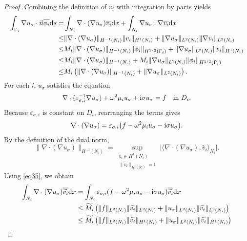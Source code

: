 \documentclass[12pt,reqno]{amsart}
\numberwithin{equation}{section}
\begin{document}
\begin{proof}
Combining the definition of $v_i$ with integration by parts yields
\begin{align}\label{eq18}
\int_{\Gamma_i}\nabla u_\sigma\cdot\vec{n}\overline{\phi_i}{\rm d}s=&\int_{N_i}\nabla\cdot(\nabla u_\sigma)\overline{v_i}{\rm d}x+\int_{N_i}\nabla u_\sigma\cdot\nabla\overline{v_i}{\rm d}x \nonumber\\
\leq&\|\nabla\cdot(\nabla u_\sigma)\|_{H^{-1}(N_i)}\|v_i\|_{H^1(N_i)}+\|\nabla u_\sigma\|_{L^2(N_i)}\|\nabla v_i\|_{L^2(N_i)} \nonumber\\
\leq& M_i\|\nabla\cdot(\nabla u_\sigma)\|_{H^{-1}(N_i)}\|\phi_i\|_{H^{1/2}(\Gamma_i)}+\|\nabla u_\sigma\|_{L^2(N_i)}\|v_i\|_{H^1(N_i)} \nonumber\\
\leq& M_i\|\nabla\cdot(\nabla u_\sigma)\|_{H^{-1}(N_i)}+M_i\|\nabla u_\sigma\|_{L^2(N_i)}\|\phi_i\|_{H^{1/2}(\Gamma_i)} \nonumber\\
\leq&M_i\left(\|\nabla\cdot(\nabla u_\sigma)\|_{H^{-1}(N_i)}+\|\nabla u_\sigma\|_{L^2(N_i)}\right).
\end{align}
For each $i$, $u_\sigma$ satisfies the equation
\begin{equation*}
    \nabla \cdot (\varepsilon_{\sigma,i}^{-1} \nabla u_\sigma) + \omega^2 \mu_i u_\sigma + {\rm i} \sigma u_\sigma = f \quad \text{in } D_i.
\end{equation*}
Because $\varepsilon_{\sigma,i}$ is constant on $D_i$, rearranging the terms gives
\begin{equation}\label{eq35}
\nabla\cdot(\nabla u_\sigma) = \varepsilon_{\sigma,i} \bigl( f - \omega^2 \mu_i u_\sigma - {\rm i} \sigma u_\sigma \bigr).
\end{equation}	
By the definition of the dual norm,
\begin{equation}\label{eq19}
\|\nabla\cdot(\nabla u_\sigma)\|_{H^{-1}(N_i)}=\sup_{\substack{\widetilde{v_i}\in H^1(N_i) \\ \|\widetilde{v_i}\|_{H^1(N_i)}=1}}\bigl|\langle\nabla\cdot(\nabla u_\sigma),\widetilde{v_i}\rangle_{N_i}\bigr|.
\end{equation}
Using \eqref{eq35}, we obtain
\begin{align*}
\int_{N_i}\nabla\cdot(\nabla u_\sigma)\overline{\widetilde{v_i}}{\rm d}x&=\int_{N_i}\varepsilon_{\sigma,i}(f-\omega^2\mu_i u_\sigma-{\rm i}\sigma u_\sigma)\overline{\widetilde{v_i}}{\rm d}x\\
&\leq \widetilde{M_i}\left(\|f\|_{L^2(N_i)}\|\widetilde{v_i}\|_{L^2(N_i)}+\|u_\sigma\|_{L^2(N_i)}\|\widetilde{v_i}\|_{L^2(N_i)}\right)\\
&\leq \widetilde{M_i}\left(\|f\|_{L^2(N_i)}\|\widetilde{v_i}\|_{H^1(N_i)}+\|u_\sigma\|_{L^2(N_i)}\|\widetilde{v_i}\|_{H^1(N_i)}\right)\\

\end{align*}
\end{proof}
\end{document}

